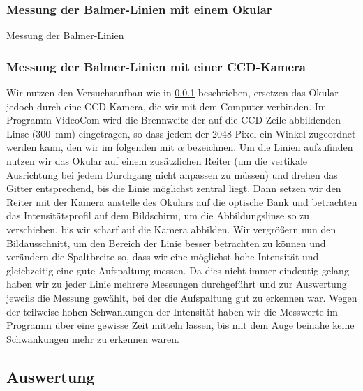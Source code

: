 \documentclass[11pt, a4paper]{article}
\numberwithin{equation}{section}
\begin{document}
\subsubsection{Messung der Balmer-Linien mit einem Okular}
\label{sssec:balmer_okular}
\begin{table}
	\centering
	
	\caption{Messung der Balmer-Linien}
	\label{tab:balmer_okular_messdaten}
\end{table}

\subsubsection{Messung der Balmer-Linien mit einer CCD-Kamera}
Wir nutzen den Versuchsaufbau wie in \ref{sssec:balmer_okular} beschrieben, ersetzen das Okular jedoch durch eine CCD Kamera, die wir mit dem Computer verbinden.
Im Programm VideoCom wird die Brennweite der auf die CCD-Zeile abbildenden Linse (\SI{300}{\milli\meter}) eingetragen, so dass jedem der 2048 Pixel ein Winkel zugeordnet werden kann, den wir im folgenden mit $\alpha$ bezeichnen.
Um die Linien aufzufinden nutzen wir das Okular auf einem zusätzlichen Reiter (um die vertikale Ausrichtung bei jedem Durchgang nicht anpassen zu müssen) und drehen das Gitter entsprechend, bis die Linie möglichst zentral liegt.
Dann setzen wir den Reiter mit der Kamera anstelle des Okulars auf die optische Bank und betrachten das Intensitätsprofil auf dem Bildschirm, um die Abbildungslinse so zu verschieben, bis wir scharf auf die Kamera abbilden.
Wir vergrößern nun den Bildausschnitt, um den Bereich der Linie besser betrachten zu können und verändern die Spaltbreite so, dass wir eine möglichst hohe Intensität und gleichzeitig eine gute Aufspaltung messen.
Da dies nicht immer eindeutig gelang haben wir zu jeder Linie mehrere Messungen durchgeführt und zur Auswertung jeweils die Messung gewählt, bei der die Aufspaltung gut zu erkennen war.
Wegen der teilweise hohen Schwankungen der Intensität haben wir die Messwerte im Programm über eine gewisse Zeit mitteln lassen, bis mit dem Auge beinahe keine Schwankungen mehr zu erkennen waren.

\subsection{Auswertung}
\end{document}

